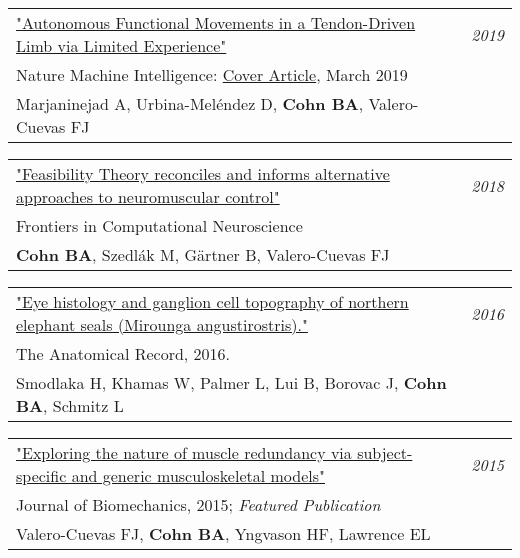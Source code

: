 \documentclass[10pt,a4paper]{article}
\begin{document}
\vspace*{1mm}\noindent\begin{tabularx}{17cm}{X r}
   \href{https://www.nature.com/articles/s42256-019-0029-0}{
   "Autonomous Functional Movements in a Tendon-Driven Limb via Limited Experience"} & \textit{2019}\\
    Nature Machine Intelligence: \href{https://github.com/bc/resume/blob/master/in_press/nature_machine_intelligence_2019.png}{Cover Article}, March 2019 \\
   Marjaninejad A, Urbina-Mel\'{e}ndez D, \textbf{Cohn BA}, Valero-Cuevas FJ \\[2mm]
\end{tabularx}


\vspace*{1mm}\noindent\begin{tabularx}{17cm}{X r}
   \href{https://github.com/bc/resume/raw/master/papers/cohn_et_al_2018_frontiers.pdf}{"Feasibility Theory reconciles and informs alternative approaches to neuromuscular control"} & \textit{2018}\\
   Frontiers in Computational Neuroscience \\
	 \textbf{Cohn BA}, Szedl\'{a}k M, G{\"a}rtner B, Valero-Cuevas FJ \\[2mm]
\end{tabularx}


\vspace*{1mm}\noindent\begin{tabularx}{17cm}{X r}
    \href{smodlaka_et_al_2016_the_anatomical_record.pdf}{"Eye histology and ganglion cell topography of northern elephant seals (Mirounga angustirostris)."}  & \textit{2016}\\
    The Anatomical Record, 2016. \\
    Smodlaka H, Khamas W, Palmer L, Lui B, Borovac J, \textbf{Cohn BA}, Schmitz L \\[2mm]
\end{tabularx}

\vspace*{1mm}\noindent\begin{tabularx}{17cm}{X r}
    \href{https://github.com/bc/resume/raw/master/papers/valero_cuevas_2015_job.pdf}{"Exploring the nature of muscle redundancy via subject-specific and generic musculoskeletal models" } & \textit{2015}\\
    Journal of Biomechanics, 2015; \textit{Featured Publication} \\
    Valero-Cuevas FJ, \textbf{Cohn BA}, Yngvason HF, Lawrence EL \\[2mm]
\end{tabularx}
\end{document}
